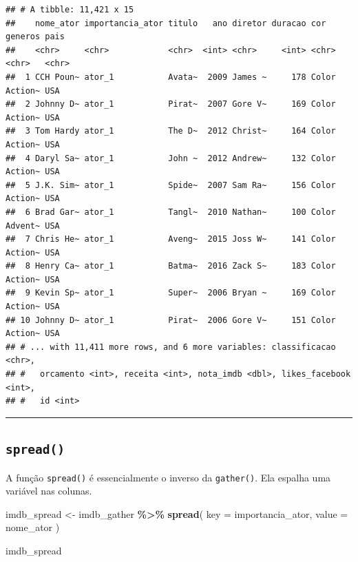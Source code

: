 \documentclass[
]{book}
\newenvironment{Shaded}{\begin{snugshade}}{\end{snugshade}}
\newcommand{\DataTypeTok}[1]{\textcolor[rgb]{0.13,0.29,0.53}{#1}}
\newcommand{\KeywordTok}[1]{\textcolor[rgb]{0.13,0.29,0.53}{\textbf{#1}}}
\newcommand{\NormalTok}[1]{#1}
\newcommand{\OperatorTok}[1]{\textcolor[rgb]{0.81,0.36,0.00}{\textbf{#1}}}
\newcommand{\StringTok}[1]{\textcolor[rgb]{0.31,0.60,0.02}{#1}}
\begin{document}
\begin{verbatim}
## # A tibble: 11,421 x 15
##    nome_ator importancia_ator titulo   ano diretor duracao cor   generos pais 
##    <chr>     <chr>            <chr>  <int> <chr>     <int> <chr> <chr>   <chr>
##  1 CCH Poun~ ator_1           Avata~  2009 James ~     178 Color Action~ USA  
##  2 Johnny D~ ator_1           Pirat~  2007 Gore V~     169 Color Action~ USA  
##  3 Tom Hardy ator_1           The D~  2012 Christ~     164 Color Action~ USA  
##  4 Daryl Sa~ ator_1           John ~  2012 Andrew~     132 Color Action~ USA  
##  5 J.K. Sim~ ator_1           Spide~  2007 Sam Ra~     156 Color Action~ USA  
##  6 Brad Gar~ ator_1           Tangl~  2010 Nathan~     100 Color Advent~ USA  
##  7 Chris He~ ator_1           Aveng~  2015 Joss W~     141 Color Action~ USA  
##  8 Henry Ca~ ator_1           Batma~  2016 Zack S~     183 Color Action~ USA  
##  9 Kevin Sp~ ator_1           Super~  2006 Bryan ~     169 Color Action~ USA  
## 10 Johnny D~ ator_1           Pirat~  2006 Gore V~     151 Color Action~ USA  
## # ... with 11,411 more rows, and 6 more variables: classificacao <chr>,
## #   orcamento <int>, receita <int>, nota_imdb <dbl>, likes_facebook <int>,
## #   id <int>
\end{verbatim}

\begin{center}\rule{0.5\linewidth}{0.5pt}\end{center}

\hypertarget{spread}{%
\subsection{\texorpdfstring{\texttt{spread()}}{spread()}}\label{spread}}

A função \texttt{spread()} é essencialmente o inverso da \texttt{gather()}. Ela espalha uma variável nas colunas.

\begin{Shaded}
\begin{Highlighting}[]
\NormalTok{imdb\_spread <{-}}\StringTok{ }\NormalTok{imdb\_gather }\OperatorTok{\%>\%}
\StringTok{  }\KeywordTok{spread}\NormalTok{(}
    \DataTypeTok{key =}\NormalTok{ importancia\_ator,}
    \DataTypeTok{value =}\NormalTok{ nome\_ator}
\NormalTok{  )}

\NormalTok{imdb\_spread}
\end{Highlighting}
\end{Shaded}
\end{document}
